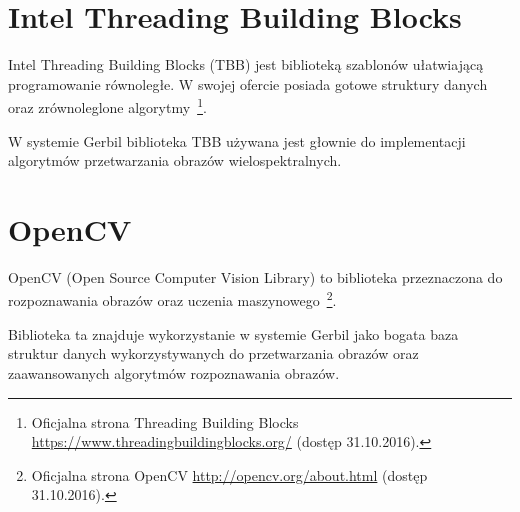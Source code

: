  \section{Intel Threading Building Blocks}
Intel Threading Building Blocks (TBB) jest biblioteką szablonów ułatwiającą programowanie równoległe. W swojej ofercie posiada gotowe struktury danych oraz zrównoleglone algorytmy~\footnote{Oficjalna strona Threading Building Blocks \url{https://www.threadingbuildingblocks.org/} (dostęp 31.10.2016).}.

W systemie Gerbil biblioteka TBB używana jest głownie do implementacji algorytmów przetwarzania obrazów wielospektralnych.

 \section{OpenCV}
OpenCV (Open Source Computer Vision Library) to biblioteka przeznaczona do rozpoznawania obrazów oraz uczenia maszynowego~\footnote{Oficjalna strona OpenCV \url{http://opencv.org/about.html} (dostęp 31.10.2016).}.

Biblioteka ta znajduje wykorzystanie w systemie Gerbil jako bogata baza struktur danych wykorzystywanych do przetwarzania obrazów oraz zaawansowanych algorytmów rozpoznawania obrazów.